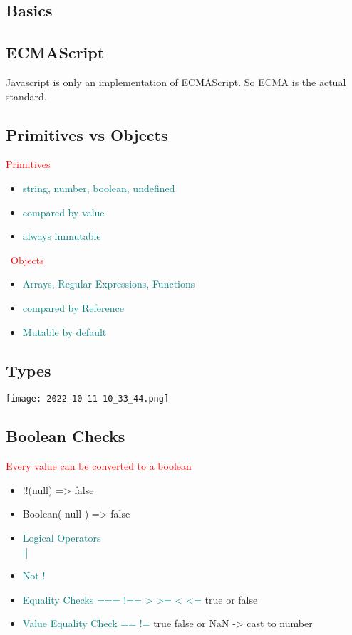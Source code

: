 \documentclass[main.tex,fontsize=6pt,paper=a4,paper=landscape,DIV=calc,]{scrartcl}
\begin{document}
\begin{multicols*}{4}


\section{Basics}

\subsection{ECMAScript} 
Javascript is only an implementation of ECMAScript. So ECMA is the actual standard.
 
\subsection{Primitives vs Objects}  
\textcolor{red}{Primitives}

\begin{itemize}
  \item \textcolor{teal}{string, number, boolean, undefined}
  \item \textcolor{teal}{compared by value}
  \item \textcolor{teal}{always immutable}
\end{itemize}
\, \newline
\textcolor{red}{Objects}
\begin{itemize}
  \item \textcolor{teal}{Arrays, Regular Expressions, Functions}
  \item \textcolor{teal}{compared by Reference}
  \item \textcolor{teal}{Mutable by default}
  
\end{itemize}


\subsection{Types} 
\texttt{[image: 2022-10-11-10\_33\_44.png]}

\subsection{Boolean Checks}  
\textcolor{red}{Every value can be converted to a boolean}\newline
\begin{itemize}
  \item !!(null) => false
  \item Boolean( null ) => false
\end{itemize}
\begin{itemize}
  \item \textcolor{teal}{Logical Operators \\ ||}
  \item \textcolor{teal}{Not !}
  \item \textcolor{teal}{Equality Checks === !== > >= < <=} true or false
  \item \textcolor{teal}{Value Equality Check == !=} true false or NaN -> cast to number
  

\end{itemize}
\end{multicols*}
\end{document}
